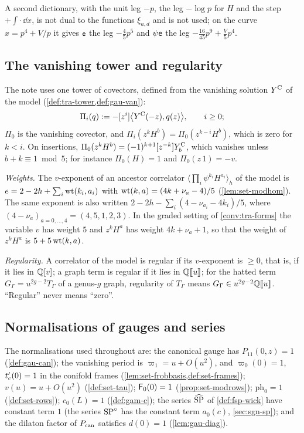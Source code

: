 A second dictionary, with the unit leg $-p$, the leg $-\log p$ for $H$ and the step $+\int\cdot\,\dd x$, is not dual to the functions $\xi_{a,d}$ and is not used; on the curve $x=p^4+V/p$ it gives $\mathsf{e}$ the leg $-\frac45p^5$ and $\psi\mathsf{e}$ the leg $-\frac{16}{45}p^9+\frac V5p^4$.

\subsection{The vanishing tower and regularity}
\label{sec:sgn-tower}

The note uses one tower of covectors, defined from the vanishing solution $Y^{\mathrm{C}}$ of the model (\cref{def:tra-tower,def:gau-van}):
\[
\Pi_i(q):=-[z^i]\bigl\langle Y^{\mathrm{C}}(-z),q(z)\bigr\rangle,\qquad i\geq0;
\] $\Pi_0$ is the vanishing covector, and $\Pi_i(z^kH^b)=\Pi_0(z^{k-i}H^b)$, which is zero for $k<i$. On insertions, $\Pi_0(z^kH^b)=(-1)^{k+1}[z^{-k}]Y^{\mathrm{C}}_b$, which vanishes unless $b+k\equiv1\bmod5$; for instance $\Pi_0(H)=1$ and $\Pi_0(z\,1)=-v$.

\emph{Weights.} The $v$-exponent of an ancestor correlator $\langle\prod_i\psi^{k_i}H^{a_i}\rangle_h$ of the model is $e=2-2h+\sum_i\operatorname{wt}(k_i,a_i)$ with $\operatorname{wt}(k,a)=(4k+\nu_a-4)/5$ (\cref{lem:set-modhom}). The same exponent is also written $2-2h-\sum_i(4-\nu_{a_i}-4k_i)/5$, where $(4-\nu_a)_{a=0,\dots,4}=(4,5,1,2,3)$. In the graded setting of \cref{conv:tra-forms} the variable $v$ has weight $5$ and $z^kH^a$ has weight $4k+\nu_a+1$, so that the weight of $z^kH^a$ is $5+5\operatorname{wt}(k,a)$.

\emph{Regularity.} A correlator of the model is regular if its $v$-exponent is $\geq0$, that is, if it lies in $\mathbb{Q}[v]$; a graph term is regular if it lies in $\mathbb{Q}[\![ u ]\!]$; for the hatted term $G_\Gamma=u^{2g-2}T_\Gamma$ of a genus-$g$ graph, regularity of $T_\Gamma$ means $G_\Gamma\in u^{2g-2}\mathbb{Q}[\![ u ]\!]$. ``Regular'' never means ``zero''.

\subsection{Normalisations of gauges and series}
\label{sec:sgn-norm}

The normalisations used throughout are: the canonical gauge has $P_{11}(0,z)=1$ (\cref{def:gau-can}); the vanishing period is $\varpi_1=u+O(u^2)$, and $\varpi_0(0)=1$, $t_{\mathrm{c}}'(0)=1$ in the conifold frames (\cref{lem:set-frobbasis,def:set-frames}); $v(u)=u+O(u^2)$ (\cref{def:set-tau}); $\mathsf{F}_0(0)=1$ (\cref{prop:set-modrows}); $\mathrm{ph}_0=1$ (\cref{def:set-rows}); $c_0(L)=1$ (\cref{def:gam-c}); the series $\widehat{\mathrm{SP}}$ of \cref{def:fsp-wick} have constant term $1$ (the series $\mathrm{SP}^{\circ}$ has the constant term $a_0(c)$, \cref{sec:sgn-sp}); and the dilaton factor of $P_{\mathrm{can}}$ satisfies $d(0)=1$ (\cref{lem:gau-diag}).


